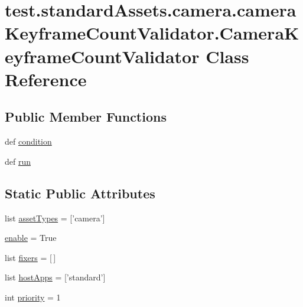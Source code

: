 \hypertarget{classtest_1_1standardAssets_1_1camera_1_1cameraKeyframeCountValidator_1_1CameraKeyframeCountValidator}{\section{test.\-standard\-Assets.\-camera.\-camera\-Keyframe\-Count\-Validator.\-Camera\-Keyframe\-Count\-Validator \-Class \-Reference}
\label{de/d8f/classtest_1_1standardAssets_1_1camera_1_1cameraKeyframeCountValidator_1_1CameraKeyframeCountValidator}
}
\subsection*{\-Public \-Member \-Functions}
\begin{DoxyCompactItemize}
\item 
def \hyperlink{classtest_1_1standardAssets_1_1camera_1_1cameraKeyframeCountValidator_1_1CameraKeyframeCountValidator_a054747a98032f629cd357cd00b795b3a}{condition}
\item 
def \hyperlink{classtest_1_1standardAssets_1_1camera_1_1cameraKeyframeCountValidator_1_1CameraKeyframeCountValidator_a2f47c1edd61362bce35cb64aa56043df}{run}
\end{DoxyCompactItemize}
\subsection*{\-Static \-Public \-Attributes}
\begin{DoxyCompactItemize}
\item 
list \hyperlink{classtest_1_1standardAssets_1_1camera_1_1cameraKeyframeCountValidator_1_1CameraKeyframeCountValidator_af06ad2fd7defcf3efb86b0311dabe5b6}{asset\-Types} = \mbox{[}'camera'\mbox{]}
\item 
\hyperlink{classtest_1_1standardAssets_1_1camera_1_1cameraKeyframeCountValidator_1_1CameraKeyframeCountValidator_aae1fbed8909874807f69173e22b0be7f}{enable} = \-True
\item 
list \hyperlink{classtest_1_1standardAssets_1_1camera_1_1cameraKeyframeCountValidator_1_1CameraKeyframeCountValidator_ae2a0a5369c911eb16a961d21406c3bf2}{fixers} = \mbox{[}$\,$\mbox{]}
\item 
list \hyperlink{classtest_1_1standardAssets_1_1camera_1_1cameraKeyframeCountValidator_1_1CameraKeyframeCountValidator_a62023006b55ff108273a333fd13af0bd}{host\-Apps} = \mbox{[}'standard'\mbox{]}
\item 
int \hyperlink{classtest_1_1standardAssets_1_1camera_1_1cameraKeyframeCountValidator_1_1CameraKeyframeCountValidator_aa4e1d091da82cbd317bf812b6e8c1b10}{priority} = 1
\end{DoxyCompactItemize}


